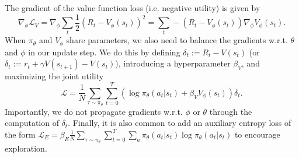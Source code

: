 The gradient of the value function loss (i.e. negative utility) is given by
\begin{equation}
    \nabla_\phi \mathcal{L}_V = \nabla_\phi \sum_t \frac12  (R_t - V_\phi(s_t))^2 = \sum_t - (R_t - V_\phi(s_t)) \nabla_\phi V_\phi(s_t).
\end{equation}
When $\pi_\theta$ and $V_\phi$ share parameters, we also need to balance the gradients w.r.t. $\theta$ and $\phi$ in our update step.
We do this by defining $\delta_t := R_t - V(s_t)$ (or $\delta_t := r_t + \gamma V(s_{t+1}) - V(s_t)$), introducing a hyperparameter $\beta_V$, and maximizing the joint utility
\begin{equation}
    \mathcal{L} = \frac{1}{N} \sum_{\tau \sim \pi_\theta} \sum_{t=0}^T ( \log \pi_\theta (a_t|s_t) + \beta_V V_\phi(s_t) ) \delta_t .
\end{equation}
Importantly, we do not propagate gradients w.r.t. $\phi$ or $\theta$ through the computation of $\delta_t$.
Finally, it is also common to add an auxiliary entropy loss of the form $\mathcal{L}_E = \beta_E \frac{1}{N} \sum_{\tau \sim \pi_\theta} \sum_{t=0}^T \sum_a \pi_\theta (a_t|s_t) \log \pi_\theta (a_t|s_t)$ to encourage exploration.



